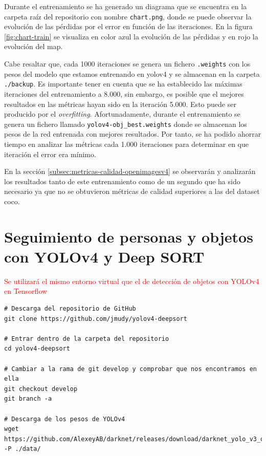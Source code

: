 Durante el entrenamiento se ha generado un diagrama que se encuentra en la carpeta raíz del repositorio con nombre \texttt{chart.png}, donde se puede observar la evolución de las pérdidas por el error en función de las iteraciones. En la figura \ref{fig:chart-train} se visualiza en color azul la evolución de las pérdidas y en rojo la evolución del \gls{map}.

Cabe resaltar que, cada 1000 iteraciones se genera un fichero \texttt{.weights} con los pesos del modelo que estamos entrenando en \gls{yolov4} y se almacenan en la carpeta \texttt{./backup}. Es importante tener en cuenta que se ha establecido las máximas iteraciones del entrenamiento a 8.000, sin embargo, es posible que el mejores resultados en las métricas hayan sido en la iteración 5.000. Esto puede ser producido por el \textit{overfitting}. Afortunadamente, durante el entrenamiento se genera un fichero llamado \texttt{yolov4-obj\_best.weights} donde se almacenan los pesos de la red entrenada con mejores resultados. Por tanto, se ha podido ahorrar tiempo en analizar las métricas cada 1.000 iteraciones para determinar en que iteración el error era mínimo.

En la sección \ref{subsec:metricas-calidad-openimagesv4} se observarán y analizarán los resultados tanto de este entrenamiento como de un segundo que ha sido necesario ya que no se obtuvieron métricas de calidad superiores a las del dataset \gls{coco}.


\newpage

\section{Seguimiento de personas y objetos con YOLOv4 y Deep SORT}
\label{sec:desarrollo-yolov4+deepsort}

\textcolor{red}{Se utilizará el mismo entorno virtual que el de detección de objetos con YOLOv4 en Tensorflow}

\vspace{0.5cm}
\begin{lstlisting}[language=iPython,caption=Evaluación del seguimiento de objetos Deep SORT y YOLOv4 en Tensorflow (1),captionpos=b,label={lst:evaluate-deepsort-tf1}]
# Descarga del repositorio de GitHub
git clone https://github.com/jmudy/yolov4-deepsort

# Entrar dentro de la carpeta del repositorio
cd yolov4-deepsort

# Cambiar a la rama de git develop y comprobar que nos encontramos en ella
git checkout develop
git branch -a

# Descarga de los pesos de YOLOv4
wget https://github.com/AlexeyAB/darknet/releases/download/darknet_yolo_v3_optimal/yolov4.weights -P ./data/
\end{lstlisting}

